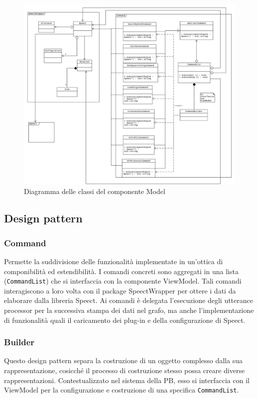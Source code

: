 \documentclass[openany,12pt,a4paper]{report}
\begin{document}
	\begin{figure}[H]
		\hspace*{-20mm}
		\includegraphics[scale=0.5]{ModelDiagram}
		\centering
		\caption{Diagramma delle classi del componente Model}
	\end{figure}
		
	\newpage
		
	\subsection{Design pattern}
	
	\subsubsection{Command}
	Permette la suddivisione delle funzionalità implementate in un'ottica di componibilità ed estendibilità. I comandi concreti sono aggregati in una lista (\verb|CommandList|) che si interfaccia con la componente ViewModel. Tali comandi interagiscono a loro volta con il package SpeectWrapper per ottere i dati da elaborare dalla libreria Speect. Ai comandi è delegata l'esecuzione degli utterance processor per la successiva stampa dei dati nel grafo, ma anche l'implementazione di funzionalità quali il caricamento dei plug-in e della configurazione di Speect.
	
	\subsubsection{Builder}
	Questo design pattern separa la costruzione di un oggetto complesso dalla sua rappresentazione, cosicché il processo di costruzione stesso possa creare diverse rappresentazioni. Contestualizzato nel sistema della PB, esso si interfaccia con il ViewModel per la configurazione e costruzione di una specifica \verb|CommandList|.
	
\end{document}
